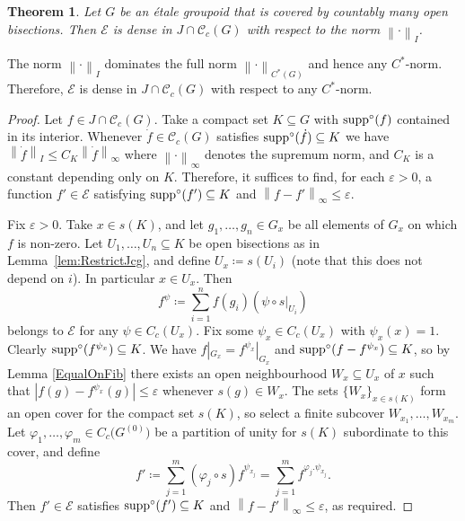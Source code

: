 \documentclass[11pt, oneside, reqno]{amsart}
\newcommand{\Gu}{G^{(0)}}
\newcommand{\cg}{\mathscr{C}_c(G)}
\newcommand{\abs}[1]{\left\vert#1\right\vert}
\newcommand{\norm}[1]{\left\|#1\right\|}
\newcommand{\supp}{{\rm supp}}
\newcommand{\osupp}{\supp^{\circ}}
\newtheorem{thm}{Theorem}[section]
\theoremstyle{definition}
\theoremstyle{remark}
\numberwithin{equation}{section}
\begin{document}
\begin{thm}\label{SpanJcg}
    Let $G$ be an \'etale groupoid that is covered by countably many open bisections. Then $\mathcal{E}$ is dense in $J \cap \cg$ with respect to the norm $\norm{\cdot}_I$.
\end{thm}

The norm $\norm{\cdot}_I$ dominates the full norm $\norm{\cdot}_{C^*(G)}$ and hence any $C^{*}$-norm. Therefore, $\mathcal{E}$ is dense in $J \cap \cg$ with respect to any $C^{*}$-norm.

\begin{proof}
    Let $f \in J \cap \cg$. Take a compact set $K \subseteq G$ with $\osupp(f)$ contained in its interior. Whenever $\dot{f} \in \cg$ satisfies $\osupp(\dot{f}) \subseteq K$ we have $\norm{\dot{f}}_{I} \le C_K \norm{\dot{f}}_\infty
    $ where $\norm{\cdot}_\infty$ denotes the supremum norm, and $C_K$ is a constant depending only on $K$. Therefore, it suffices to find, for each $\varepsilon>0$, a function $f' \in \mathcal{E}$ satisfying $\osupp(f') \subseteq K$ and $\norm{f-f'}_\infty \le \varepsilon$.
    
    Fix $\varepsilon>0$. Take $x \in s(K)$, and let $g_1, \dotsc, g_n \in G_x$ be all elements of $G_x$ on which $f$ is non-zero. Let $U_1, \dots, U_n \subseteq K$ be open bisections as in Lemma~\ref{lem:RestrictJcg}, and define $U_x \coloneq s(U_i)$ (note that this does not depend on $i$). In particular $x \in U_x$. Then
    \[
    f^{\psi} \coloneq \sum_{i=1}^n f(g_i) (\psi \circ s \vert_{U_i})
    \]
    belongs to $\mathcal{E}$ for any $\psi \in C_c(U_x)$. Fix some $\psi_x \in C_c(U_x)$ with $\psi_x(x) = 1$. Clearly $\osupp(f^{\psi_x}) \subseteq K$. We have $f|_{G_{x}} = f^{\psi_x}|_{G_{x}}$ and $\osupp(f-f^{\psi_x}) \subseteq K$, so by Lemma \ref{EqualOnFib} there exists an open neighbourhood $W_x \subseteq U_x$ of $x$ such that $\abs{f(g) - f^{\psi_x}(g)} \le \varepsilon$ whenever $s(g) \in W_x$. The sets $\{W_x\}_{x \in s(K)}$ form an open cover for the compact set $s(K)$, so select a finite subcover $W_{x_1}, \dotsc, W_{x_m}$. Let $\varphi_1, \dots, \varphi_m \in C_c\big(\Gu\big)$ be a partition of unity for $s(K)$ subordinate to this cover, and define
    \[
    f' \coloneq \sum_{j=1}^m (\varphi_j \circ s) f^{\psi_{x_j}} = \sum_{j=1}^m f^{\varphi_j.\psi_{x_j}}.
    \]
    Then $f' \in \mathcal{E}$ satisfies $\osupp(f') \subseteq K$ and $\norm{f-f'}_\infty \le \varepsilon$, as required.
\end{proof}
\end{document}
